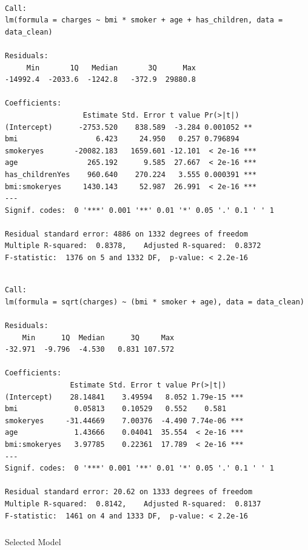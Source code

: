 \documentclass[
  letterpaper,
  DIV=11,
  numbers=noendperiod]{scrartcl}
\makeatletter
\let\oldsubparagraph\subparagraph
\renewcommand{\subparagraph}{
    \@ifstar
      \xxxSubParagraphStar
      \xxxSubParagraphNoStar
  }
\newcommand{\xxxSubParagraphStar}[1]{\oldsubparagraph*{#1}\mbox{}}
\newcommand{\xxxSubParagraphNoStar}[1]{\oldsubparagraph{#1}\mbox{}}
\makeatother
\begin{document}
\begin{verbatim}

Call:
lm(formula = charges ~ bmi * smoker + age + has_children, data = data_clean)

Residuals:
     Min       1Q   Median       3Q      Max 
-14992.4  -2033.6  -1242.8   -372.9  29880.8 

Coefficients:
                  Estimate Std. Error t value Pr(>|t|)    
(Intercept)      -2753.520    838.589  -3.284 0.001052 ** 
bmi                  6.423     24.950   0.257 0.796894    
smokeryes       -20082.183   1659.601 -12.101  < 2e-16 ***
age                265.192      9.585  27.667  < 2e-16 ***
has_childrenYes    960.640    270.224   3.555 0.000391 ***
bmi:smokeryes     1430.143     52.987  26.991  < 2e-16 ***
---
Signif. codes:  0 '***' 0.001 '**' 0.01 '*' 0.05 '.' 0.1 ' ' 1

Residual standard error: 4886 on 1332 degrees of freedom
Multiple R-squared:  0.8378,    Adjusted R-squared:  0.8372 
F-statistic:  1376 on 5 and 1332 DF,  p-value: < 2.2e-16
\end{verbatim}

\begin{verbatim}

Call:
lm(formula = sqrt(charges) ~ (bmi * smoker + age), data = data_clean)

Residuals:
    Min      1Q  Median      3Q     Max 
-32.971  -9.796  -4.530   0.831 107.572 

Coefficients:
               Estimate Std. Error t value Pr(>|t|)    
(Intercept)    28.14841    3.49594   8.052 1.79e-15 ***
bmi             0.05813    0.10529   0.552    0.581    
smokeryes     -31.44669    7.00376  -4.490 7.74e-06 ***
age             1.43666    0.04041  35.554  < 2e-16 ***
bmi:smokeryes   3.97785    0.22361  17.789  < 2e-16 ***
---
Signif. codes:  0 '***' 0.001 '**' 0.01 '*' 0.05 '.' 0.1 ' ' 1

Residual standard error: 20.62 on 1333 degrees of freedom
Multiple R-squared:  0.8142,    Adjusted R-squared:  0.8137 
F-statistic:  1461 on 4 and 1333 DF,  p-value: < 2.2e-16
\end{verbatim}

\subparagraph{Selected Model}\label{selected-model}
\end{document}
